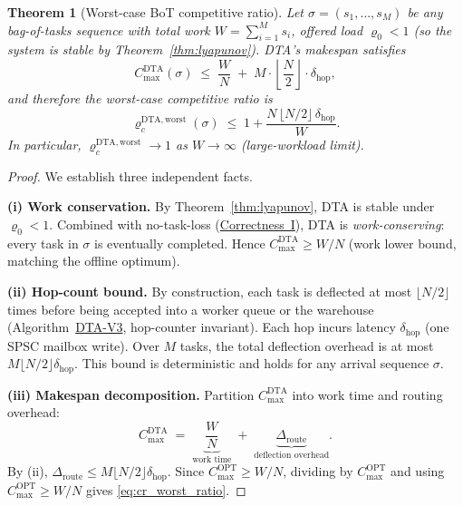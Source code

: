 \documentclass[11pt,a4paper]{article}
\newtheorem{theorem}{Theorem}[section]
\begin{document}
\begin{theorem}[Worst-case BoT competitive ratio]\label{thm:cr_bot_worst}
Let $\sigma = (s_1, \ldots, s_M)$ be any bag-of-tasks sequence with total
work $W = \sum_{i=1}^M s_i$, offered load $\varrho_0 < 1$
(so the system is stable by Theorem~\ref{thm:lyapunov}).
DTA's makespan satisfies
\begin{equation}\label{eq:cr_worst}
  C_{\max}^{\mathrm{DTA}}(\sigma)
  \;\le\;
  \frac{W}{N}
  \;+\;
  M \cdot \left\lfloor \frac{N}{2} \right\rfloor \cdot \delta_{\mathrm{hop}},
\end{equation}
and therefore the worst-case competitive ratio is
\begin{equation}\label{eq:cr_worst_ratio}
  \varrho_c^{\mathrm{DTA,worst}}(\sigma)
  \;\le\;
  1 + \frac{N\,\lfloor N/2 \rfloor\,\delta_{\mathrm{hop}}}{W}.
\end{equation}
In particular, $\varrho_c^{\mathrm{DTA,worst}} \to 1$ as $W \to \infty$ (large-workload limit).
\end{theorem}

\begin{proof}
We establish three independent facts.

\textbf{(i) Work conservation.}
By Theorem~\ref{thm:lyapunov}, DTA is stable under $\varrho_0 < 1$.
Combined with no-task-loss (\hyperref[chap:no_task_loss]{Correctness~I}),
DTA is \emph{work-conserving}: every task in $\sigma$ is eventually completed.
Hence $C_{\max}^{\mathrm{DTA}} \ge W/N$ (work lower bound, matching the offline optimum).

\textbf{(ii) Hop-count bound.}
By construction, each task is deflected at most $\lfloor N/2 \rfloor$ times
before being accepted into a worker queue or the warehouse
(Algorithm~\hyperref[chap:formal_model]{DTA-V3}, hop-counter invariant).
Each hop incurs latency $\delta_{\mathrm{hop}}$ (one SPSC mailbox write).
Over $M$ tasks, the total deflection overhead is at most
$M \lfloor N/2 \rfloor \delta_{\mathrm{hop}}$.
This bound is deterministic and holds for any arrival sequence $\sigma$.

\textbf{(iii) Makespan decomposition.}
Partition $C_{\max}^{\mathrm{DTA}}$ into work time and routing overhead:
\[
  C_{\max}^{\mathrm{DTA}}
  \;=\;
  \underbrace{\frac{W}{N}}_{\text{work time}}
  \;+\;
  \underbrace{\Delta_{\mathrm{route}}}_{\text{deflection overhead}}.
\]
By (ii), $\Delta_{\mathrm{route}} \le M \lfloor N/2 \rfloor \delta_{\mathrm{hop}}$.
Since $C_{\max}^{\mathrm{OPT}} \ge W/N$, dividing by $C_{\max}^{\mathrm{OPT}}$
and using $C_{\max}^{\mathrm{OPT}} \ge W/N$ gives \eqref{eq:cr_worst_ratio}.
\end{proof}
\end{document}
